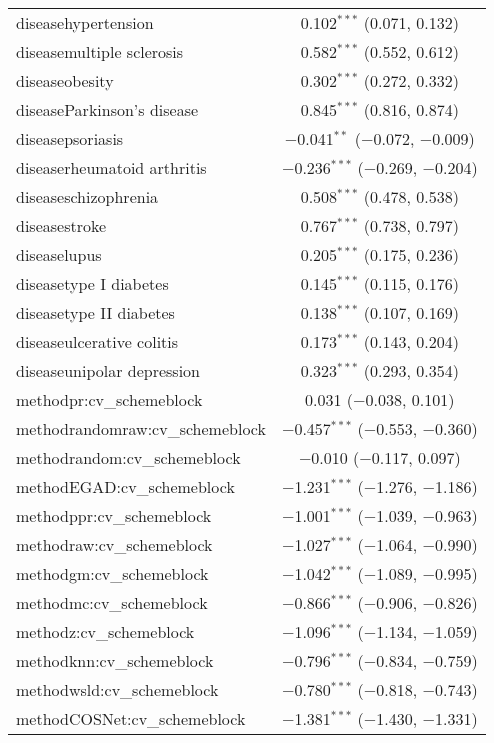 \begin{table}[!htbp]
\begin{tabular}{@{\extracolsep{5pt}}lc}
  diseasehypertension & 0.102$^{***}$ (0.071, 0.132) \\ 
  diseasemultiple sclerosis & 0.582$^{***}$ (0.552, 0.612) \\ 
  diseaseobesity & 0.302$^{***}$ (0.272, 0.332) \\ 
  diseaseParkinson's disease & 0.845$^{***}$ (0.816, 0.874) \\ 
  diseasepsoriasis & $-$0.041$^{**}$ ($-$0.072, $-$0.009) \\ 
  diseaserheumatoid arthritis & $-$0.236$^{***}$ ($-$0.269, $-$0.204) \\ 
  diseaseschizophrenia & 0.508$^{***}$ (0.478, 0.538) \\ 
  diseasestroke & 0.767$^{***}$ (0.738, 0.797) \\ 
  diseaselupus & 0.205$^{***}$ (0.175, 0.236) \\ 
  diseasetype I diabetes & 0.145$^{***}$ (0.115, 0.176) \\ 
  diseasetype II diabetes & 0.138$^{***}$ (0.107, 0.169) \\ 
  diseaseulcerative colitis & 0.173$^{***}$ (0.143, 0.204) \\ 
  diseaseunipolar depression & 0.323$^{***}$ (0.293, 0.354) \\ 
  methodpr:cv\_schemeblock & 0.031 ($-$0.038, 0.101) \\ 
  methodrandomraw:cv\_schemeblock & $-$0.457$^{***}$ ($-$0.553, $-$0.360) \\ 
  methodrandom:cv\_schemeblock & $-$0.010 ($-$0.117, 0.097) \\ 
  methodEGAD:cv\_schemeblock & $-$1.231$^{***}$ ($-$1.276, $-$1.186) \\ 
  methodppr:cv\_schemeblock & $-$1.001$^{***}$ ($-$1.039, $-$0.963) \\ 
  methodraw:cv\_schemeblock & $-$1.027$^{***}$ ($-$1.064, $-$0.990) \\ 
  methodgm:cv\_schemeblock & $-$1.042$^{***}$ ($-$1.089, $-$0.995) \\ 
  methodmc:cv\_schemeblock & $-$0.866$^{***}$ ($-$0.906, $-$0.826) \\ 
  methodz:cv\_schemeblock & $-$1.096$^{***}$ ($-$1.134, $-$1.059) \\ 
  methodknn:cv\_schemeblock & $-$0.796$^{***}$ ($-$0.834, $-$0.759) \\ 
  methodwsld:cv\_schemeblock & $-$0.780$^{***}$ ($-$0.818, $-$0.743) \\ 
  methodCOSNet:cv\_schemeblock & $-$1.381$^{***}$ ($-$1.430, $-$1.331) \\ 

\end{tabular}
\end{table}
